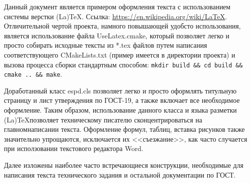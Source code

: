 \annotation

Данный документ является примером оформления текста с использованием системы верстки (La)\TeX. Ссылка: \url{https://en.wikipedia.org/wiki/LaTeX}. Отличительной чертой проекта, намного повышающей удобсто использования, является использование файла UseLatex.cmake, который позволяет легко и просто собирать исходные тексты из *.tex файлов путем написания соответствующего CMakeLists.txt (пример имеется в директории проекта) и вызова процесса сборки стандартным способом: \lstinline|mkdir build && cd build && cmake .. && make|.

Доработанный класс espd.cls позволяет легко и просто оформлять титульную страницу и лист утверждения по ГОСТ-19, а также включает все необходимое оформление. Таким образом, использование данного класса и языка разметки (La)\TeX позволяет техническому писателю сконцентрироваться на главном\mdash написании текста. Оформление формул, таблиц, вставка рисунков также значительно упрощаются, исключается их <<съезжание>>, как часто случается при исползовании текстового редактора Word.

Далее изложены наиболее часто встречающиеся конструкции, необходимые для написания текста технического задания и остальной документации по ГОСТ.

%
%
%
